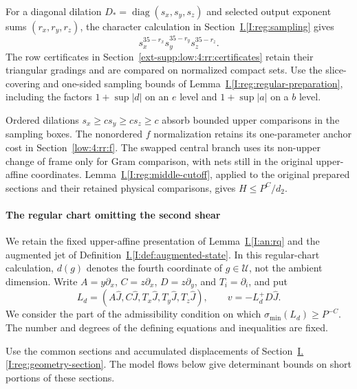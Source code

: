 \documentclass[11pt]{amsart}
\theoremstyle{definition}
\theoremstyle{remark}
\DeclareMathOperator{\diag}{diag}
\numberwithin{equation}{section}
\newcommand{\partIref}[1]{\hyperref[I:#1]{I.\ref*{I:#1}}}
\begin{document}
For a diagonal dilation $D_*=\diag(s_x,s_y,s_z)$ and selected output exponent sums $(r_x,r_y,r_z)$, the character calculation in Section~\partIref{reg:sampling} gives
\begin{equation}\label{low:4:cf:weight}
s_x^{35-r_x}s_y^{35-r_y}s_z^{35-r_z}.
\end{equation}
The row certificates in Section~\ref{ext-supp:low:4:rr:certificates} retain their triangular gradings and are compared on normalized compact sets. Use the slice-covering and one-sided sampling bounds of Lemma~\partIref{reg:regular-preparation}, including the factors $1+\sup|d|$ on an $e$ level and $1+\sup|a|$ on a $b$ level.

Ordered dilations $s_x\ge c s_y\ge c s_z\ge c$ absorb bounded upper comparisons in the sampling boxes. The nonordered $f$ normalization retains its one-parameter anchor cost in Section~\ref{low:4:rr:f}. The swapped central branch uses its non-upper change of frame only for Gram comparison, with nets still in the original upper-affine coordinates. Lemma~\partIref{reg:middle-cutoff}, applied to the original prepared sections and their retained physical comparisons, gives $H\le P^C/d_2$.

\paragraph{The regular chart omitting the second shear}

We retain the fixed upper-affine presentation of Lemma~\partIref{an:rq} and the augmented jet of Definition~\partIref{def:augmented-state}. In this regular-chart calculation, $d(g)$ denotes the fourth coordinate of $g\in\mathcal U$, not the ambient dimension. Write $A=y\partial_x$, $C=z\partial_x$, $D=z\partial_y$, and $T_i=\partial_i$, and put
\[
L_d=(A\widehat J,C\widehat J,T_x\widehat J,T_y\widehat J,T_z\widehat J),\qquad v=-L_d^+D\widehat J.
\]
We consider the part of the admissibility condition on which $\sigma_{\min}(L_d)\ge P^{-C}$. The number and degrees of the defining equations and inequalities are fixed.

Use the common sections and accumulated displacements of Section~\partIref{reg:geometry-section}. The model flows below give determinant bounds on short portions of these sections.
\end{document}
